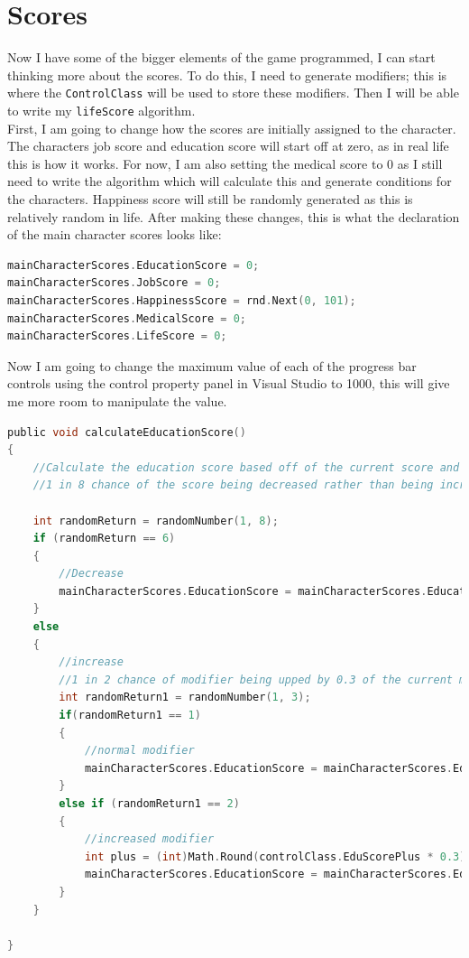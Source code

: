 \section{Scores}
Now I have some of the bigger elements of the game programmed, I can start thinking more about the scores. To do this, I need to generate modifiers; this is where the \verb|ControlClass| will be used to store these modifiers. Then I will be able to write my \verb|lifeScore| algorithm.\\
First, I am going to change how the scores are initially assigned to the character. The character\textquotesingle s job score and education score will start off at zero, as in real life this is how it works. For now, I am also setting the medical score to 0 as I still need to write the algorithm which will calculate this and generate conditions for the characters. Happiness score will still be randomly generated as this is relatively random in life. After making these changes, this is what the declaration of the main character scores looks like:
\begin{lstlisting}[language=c, style=csharp, caption=Initial score assignment to character]
mainCharacterScores.EducationScore = 0;
mainCharacterScores.JobScore = 0;
mainCharacterScores.HappinessScore = rnd.Next(0, 101);
mainCharacterScores.MedicalScore = 0;
mainCharacterScores.LifeScore = 0;
\end{lstlisting}
Now I am going to change the maximum value of each of the progress bar controls using the control property panel in Visual Studio to 1000, this will give me more room to manipulate the value.
\begin{lstlisting}[language=c, style=csharp, caption=Original education score calculator]
public void calculateEducationScore()
{
    //Calculate the education score based off of the current score and the modifier
    //1 in 8 chance of the score being decreased rather than being increased. When decreased, needs to go down a fair chunk.

    int randomReturn = randomNumber(1, 8);
    if (randomReturn == 6)
    {
        //Decrease
        mainCharacterScores.EducationScore = mainCharacterScores.EducationScore - controlClass.EduScorePlus;
    }
    else
    {
        //increase 
        //1 in 2 chance of modifier being upped by 0.3 of the current modifier.
        int randomReturn1 = randomNumber(1, 3);
        if(randomReturn1 == 1)
        {
            //normal modifier
            mainCharacterScores.EducationScore = mainCharacterScores.EducationScore + controlClass.EduScorePlus;
        }
        else if (randomReturn1 == 2)
        {
            //increased modifier
            int plus = (int)Math.Round(controlClass.EduScorePlus * 0.3);
            mainCharacterScores.EducationScore = mainCharacterScores.EducationScore + plus;
        }
    }

}
\end{lstlisting}
